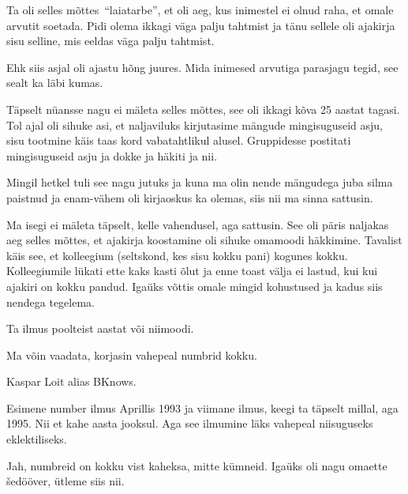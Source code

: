 Ta oli selles mõttes \enquote{laiatarbe}, et oli aeg, kus inimestel ei olnud 
raha, et omale arvutit soetada. Pidi olema ikkagi väga palju tahtmist ja tänu 
sellele oli ajakirja sisu selline, mis eeldas väga palju tahtmist. 

Ehk siis asjal oli ajastu hõng juures. Mida inimesed arvutiga parasjagu tegid, 
see  sealt ka läbi kumas. 


Täpselt nüansse nagu ei mäleta selles mõttes, see oli ikkagi kõva 25 aastat 
tagasi. Tol ajal oli sihuke asi, et naljaviluks kirjutasime mängude 
mingisuguseid asju, sisu tootmine käis taas kord vabatahtlikul alusel. 
Gruppidesse postitati mingisuguseid asju ja dokke ja häkiti ja nii. 


Mingil hetkel tuli see nagu jutuks ja kuna ma olin nende mängudega juba silma 
paistnud ja enam-vähem oli kirjaoskus ka olemas, siis nii ma sinna sattusin. 

Ma isegi ei mäleta täpselt, kelle vahendusel, aga sattusin. See oli päris 
naljakas aeg selles mõttes, et ajakirja koostamine oli sihuke omamoodi 
häkkimine. Tavalist käis see, et kolleegium (seltskond, kes sisu kokku pani) 
kogunes kokku. Kolleegiumile lükati ette kaks kasti õlut ja enne toast välja ei 
lastud, kui kui ajakiri on kokku pandud. Igaüks võttis omale mingid kohustused 
ja kadus siis nendega tegelema.


Ta ilmus poolteist aastat või niimoodi.


Ma võin vaadata, korjasin vahepeal numbrid kokku.


Kaspar Loit alias BKnows.

Esimene number ilmus Aprillis 1993 ja viimane ilmus, keegi ta täpselt millal, 
aga 1995. Nii et kahe aasta jooksul. Aga see ilmumine läks vahepeal niisuguseks 
eklektiliseks.


Jah, numbreid on kokku vist kaheksa, mitte kümneid. Igaüks oli nagu omaette 
šedööver, ütleme siis nii.

